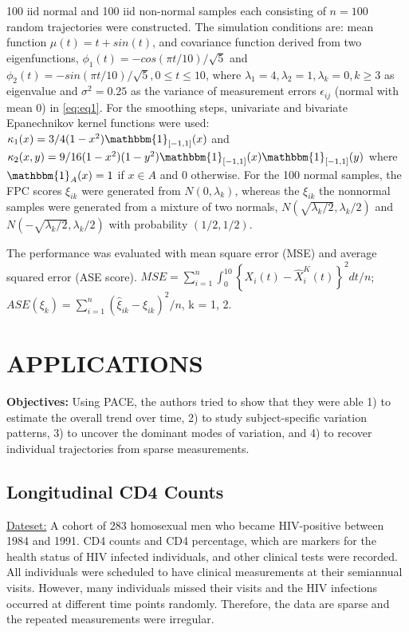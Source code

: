 \documentclass[11pt]{report}
\begin{document}
100 iid normal and 100 iid non-normal samples each consisting of $n = 100$ random trajectories were constructed. 
The simulation conditions are: mean function $\mu(t) = t + sin(t)$, and covariance function derived from two eigenfunctions, $\phi_1(t) = -cos(\pi t/10)/\sqrt{5}$ and $\phi_2(t) = -sin(\pi t/10)/\sqrt{5}, 0 \leq t \leq 10$, where $\lambda_1 = 4, \lambda_2 = 1, \lambda_k = 0, k \geq 3$ as eigenvalue and $\sigma^2 = 0.25$ as the variance of measurement errors $\epsilon_{ij}$ (normal with mean 0) in \eqref{eq:eq1}. 
For the smoothing steps, univariate and bivariate Epanechnikov kernel functions were used: $\kappa_1 (x) = 3/4 (1 - x^2) \mathbbm{1}_{[-1, 1]} (x) $ and $\kappa_2 (x, y) = 9/16 (1 - x^2)(1 - y^2) \mathbbm{1}_{[-1, 1]} (x) \mathbbm{1}_{[-1, 1]} (y)$ where $\mathbbm{1}_A (x) = 1$ if $x \in A$ and 0 otherwise.  
For the 100 normal samples, the FPC scores $\xi_{ik}$ were generated from $N(0,\lambda_k)$, whereas the $\xi_{ik}$ the nonnormal samples were generated from a mixture of two normals, $N(\sqrt{\lambda_k/2}, \lambda_k/2) $ and $ N(-\sqrt{\lambda_k/2}, \lambda_k/2)$ with probability $(1/2, 1/2)$.

The performance was evaluated with mean square error (MSE) and average squared error (ASE score). 
$MSE = \sum_{i = 1}^{n} \int_{0}^{10} \left\{X_i(t) - \widehat{X}_i^K(t) \right\}^2 dt/n $; 
$ASE(\xi_k) = \sum_{i = 1}^n (\hat{\xi}_{ik} - \xi_{ik})^2/n$, k = 1, 2. 

\section{APPLICATIONS}

\noindent \textbf{Objectives:} Using PACE, the authors tried to show that they were able 1) to estimate the overall trend over time, 2) to study subject-specific variation patterns, 3) to uncover the dominant modes of variation, and 4) to recover individual trajectories from sparse measurements.

\subsection*{Longitudinal CD4 Counts}
\noindent \underline{Dateset:} A cohort of 283 homosexual men who became HIV-positive between 1984 and 1991. 
CD4 counts and CD4 percentage, which are markers for the health status of HIV infected individuals, and other clinical tests were recorded.
All individuals were scheduled to have clinical measurements at their semiannual visits. 
However, many individuals missed their visits and the HIV infections occurred at different time points randomly. 
Therefore, the data are sparse and the repeated measurements were irregular. 
\end{document}
